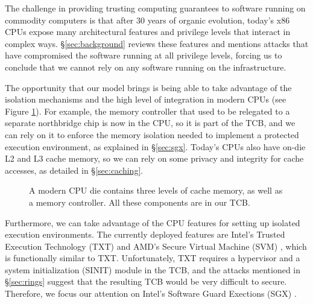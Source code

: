 The challenge in providing trusting computing guarantees to software running on
commodity computers is that after 30 years of organic evolution, today's x86
CPUs expose many architectural features and privilege levels that interact in
complex ways. \S \ref{sec:background} reviews these features and mentions
attacks that have compromised the software running at all privilege levels,
forcing us to conclude that we cannot rely on any software running on the
infrastructure.

The opportunity that our model brings is being able to take advantage of the
isolation mechanisms and the high level of integration in modern CPUs (see
Figure \ref{fig:cpu_die}). For example, the memory controller that used to be
relegated to a separate northbridge chip is now in the CPU, so it is part of
the TCB, and we can rely on it to enforce the memory isolation needed to
implement a protected execution environment, as explained in \S \ref{sec:sgx}.
Today's CPUs also have on-die L2 and L3 cache memory, so we can rely on some
privacy and integrity for cache accesses, as detailed in \S \ref{sec:caching}.

\begin{figure}[hbtp]
  \caption{
    A modern CPU die contains three levels of cache memory, as well as a
    memory controller. All these components are in our TCB.
  }
  \label{fig:cpu_die}
\end{figure}

Furthermore, we can take advantage of the CPU features for setting up isolated
execution environments. The currently deployed features are Intel's Trusted
Execution Technology (TXT) \cite{grawrock2009txt} and AMD's Secure Virtual
Machine (SVM) \cite{strongin2005trusted}, which is functionally similar to TXT.
Unfortunately, TXT requires a hypervisor and a system initialization (SINIT)
module in the TCB, and the attacks mentioned in \S \ref{sec:rings} suggest that
the resulting TCB would be very difficult to secure. Therefore, we focus our
attention on Intel's Software Guard Exections (SGX) \cite{mckeen2013innovative}
\cite{anati2013sgx}.


